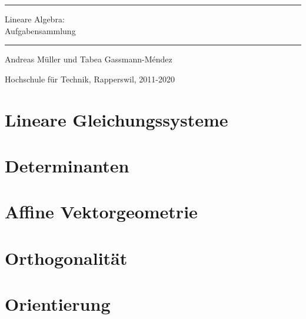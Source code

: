 \documentclass[a4paper,12pt]{book}
\begin{document}
\pagestyle{fancy}
\rhead{}
\frontmatter
\newcommand\HRule{\noindent\rule{\linewidth}{1.5pt}}
\begin{titlepage}
\HRule
\vspace*{2pt}
\begin{flushright}
{\Huge
Lineare Algebra:\\
\bigskip
Aufgabensammlung}
\end{flushright}
\HRule
\begin{flushright}
\vspace{30pt}
\LARGE
Andreas Müller
und
Tabea Gassmann-Méndez
\end{flushright}
\begin{center}
Hochschule für Technik, Rapperswil, 2011-2020
\end{center}
\end{titlepage}
\tableofcontents
\newenvironment{beispiel}[1][Beispiel]{%
\begin{proof}[#1]%
\renewcommand{\qedsymbol}{$\bigcirc$}
}{\end{proof}}
\mainmatter


\openthemaindex
{}
\allowdisplaybreaks
\chapter{Lineare Gleichungssysteme}

\chapter{Determinanten}

\chapter{Affine Vektorgeometrie}

\chapter{Orthogonalität}

\chapter{Orientierung}

\end{document}
